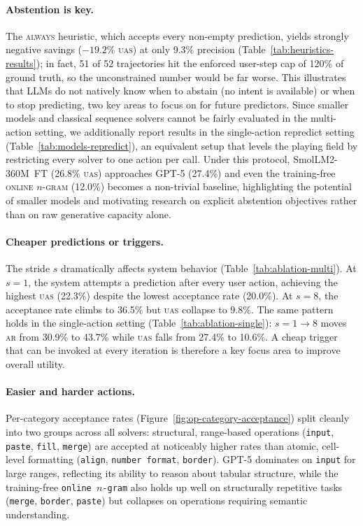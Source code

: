 \documentclass{article}
\newcommand{\op}[1]{\texttt{\small #1}}
\theoremstyle{plain}
\theoremstyle{definition}
\theoremstyle{remark}
\begin{document}
\paragraph{Abstention is key.}

The \textsc{always} heuristic, which accepts every non-empty prediction, yields strongly negative savings ($-19.2$\% \textsc{uas}) at only 9.3\% precision (Table~\ref{tab:heuristics-results}); in fact, 51 of 52 trajectories hit the enforced user-step cap of 120\% of ground truth, so the unconstrained number would be far worse.
This illustrates that LLMs do not natively know when to abstain (no intent is available) or when to stop predicting, two key areas to focus on for future predictors.
Since smaller models and classical sequence solvers cannot be fairly evaluated in the multi-action setting, we additionally report results in the single-action repredict setting (Table~\ref{tab:models-repredict}), an equivalent setup that levels the playing field by restricting every solver to one action per call.
Under this protocol, \mbox{SmolLM2-360M FT} (26.8\% \textsc{uas}) approaches GPT-5 (27.4\%) and even the training-free \textsc{online $n$-gram} (12.0\%) becomes a non-trivial baseline, highlighting the potential of smaller models and motivating research on explicit abstention objectives rather than on raw generative capacity alone.


\paragraph{Cheaper predictions or triggers.}

The stride $s$ dramatically affects system behavior (Table~\ref{tab:ablation-multi}).
At $s{=}1$, the system attempts a prediction after every user action, achieving the highest \textsc{uas} (22.3\%) despite the lowest acceptance rate (20.0\%).
At $s{=}8$, the acceptance rate climbs to 36.5\% but \textsc{uas} collapse to 9.8\%.
The same pattern holds in the single-action setting (Table~\ref{tab:ablation-single}): $s{=}1\!\to\!8$ moves \textsc{ar} from 30.9\% to 43.7\% while \textsc{uas} falls from 27.4\% to 10.6\%.
A cheap trigger that can be invoked at every iteration is therefore a key focus area to improve overall utility.

\paragraph{Easier and harder actions.}
Per-category acceptance rates (Figure~\ref{fig:op-category-acceptance}) split cleanly into two groups across all solvers: structural, range-based operations (\op{input}, \op{paste}, \op{fill}, \op{merge}) are accepted at noticeably higher rates than atomic, cell-level formatting (\op{align}, \op{number format}, \op{border}).
GPT-5 dominates on \op{input} for large ranges, reflecting its ability to reason about tabular structure, while the training-free \op{online $n$-gram} also holds up well on structurally repetitive tasks (\op{merge}, \op{border}, \op{paste}) but collapses on operations requiring semantic understanding.
\end{document}
